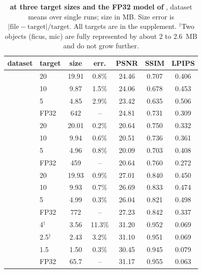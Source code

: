 \begin{table}[t]\centering\footnotesize
\caption{\textbf{\BM at three target sizes and the FP32 model of \MS}, dataset means over single runs; size in MB. Size error is $|\text{file}-\text{target}|/\text{target}$. All targets are in the supplement. $^\dagger$Two objects (ficus, mic) are fully represented by about 2 to 2.6~MB and do not grow further.}
\label{tab:main}
\setlength{\tabcolsep}{3.2pt}
\begin{tabular}{@{}llccccc@{}}
\toprule
dataset & target & size & err. & PSNR & SSIM & LPIPS \\
\midrule
{} & 20 & 19.91 & 0.8\% & 24.46 & 0.707 & 0.406 \\
 & 10 & 9.87 & 1.5\% & 24.06 & 0.678 & 0.453 \\
 & 5 & 4.85 & 2.9\% & 23.42 & 0.635 & 0.506 \\
 & FP32 & 642 & -- & 24.81 & 0.731 & 0.309 \\
\midrule
{} & 20 & 20.01 & 0.2\% & 20.64 & 0.750 & 0.332 \\
 & 10 & 9.94 & 0.6\% & 20.51 & 0.736 & 0.361 \\
 & 5 & 4.96 & 0.8\% & 20.09 & 0.703 & 0.408 \\
 & FP32 & 459 & -- & 20.64 & 0.760 & 0.272 \\
\midrule
{} & 20 & 19.93 & 0.9\% & 27.01 & 0.840 & 0.450 \\
 & 10 & 9.93 & 0.7\% & 26.69 & 0.833 & 0.474 \\
 & 5 & 4.99 & 0.3\% & 26.04 & 0.821 & 0.498 \\
 & FP32 & 772 & -- & 27.23 & 0.842 & 0.337 \\
\midrule
{} & 4$^\dagger$ & 3.56 & 11.3\% & 31.20 & 0.952 & 0.069 \\
 & 2.5$^\dagger$ & 2.43 & 3.2\% & 31.10 & 0.951 & 0.069 \\
 & 1.5 & 1.50 & 0.3\% & 30.45 & 0.945 & 0.079 \\
 & FP32 & 65.7 & -- & 31.17 & 0.955 & 0.063 \\
\bottomrule
\end{tabular}
\end{table}

